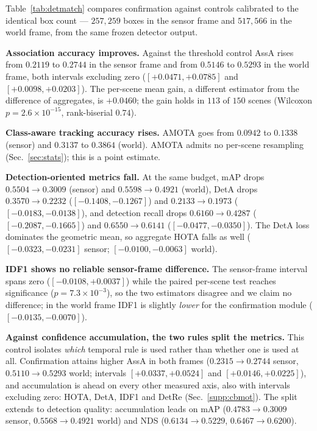 Table~\ref{tab:detmatch} compares confirmation against controls calibrated to
the identical box count --- $257{,}259$ boxes in the sensor frame and
$517{,}566$ in the world frame, from the same frozen detector output.

\noindent\textbf{Association accuracy improves.} Against the threshold control
AssA rises from $0.2119$ to $0.2744$ in the sensor frame and from $0.5146$ to
$0.5293$ in the world frame, both intervals excluding zero
($[{+}0.0471,{+}0.0785]$ and $[{+}0.0098,{+}0.0203]$). The per-scene mean gain, a different estimator
from the difference of aggregates, is $+0.0460$; the gain holds in $113$ of
$150$ scenes
(Wilcoxon $p{=}2.6{\times}10^{-15}$, rank-biserial $0.74$).

\noindent\textbf{Class-aware tracking accuracy rises.} AMOTA goes from
$0.0942$ to $0.1338$ (sensor) and $0.3137$ to $0.3864$ (world). AMOTA admits no per-scene resampling
(Sec.~\ref{sec:stats}); this is a point estimate.

\noindent\textbf{Detection-oriented metrics fall.} At the same budget, mAP
drops $0.5504\!\to\!0.3009$ (sensor) and $0.5598\!\to\!0.4921$ (world), DetA
drops $0.3570\!\to\!0.2232$ ($[{-}0.1408,{-}0.1267]$) and
$0.2133\!\to\!0.1973$ ($[{-}0.0183,{-}0.0138]$), and detection recall drops
$0.6160\!\to\!0.4287$ ($[{-}0.2087,{-}0.1665]$) and $0.6550\!\to\!0.6141$
($[{-}0.0477,{-}0.0350]$). The DetA loss dominates the geometric mean, so
aggregate HOTA falls as well ($[{-}0.0323,{-}0.0231]$ sensor;
$[{-}0.0100,{-}0.0063]$ world).

\noindent\textbf{IDF1 shows no reliable sensor-frame difference.} The
sensor-frame interval spans zero ($[{-}0.0108,{+}0.0037]$) while the paired
per-scene test reaches significance ($p{=}7.3{\times}10^{-3}$), so the two
estimators disagree and we claim no difference; in the world frame IDF1 is
slightly \emph{lower} for the confirmation module
($[{-}0.0135,{-}0.0070]$).

\noindent\textbf{Against confidence accumulation, the two rules split the
metrics.} This control isolates \emph{which} temporal rule is used rather
than whether one is used at all. Confirmation attains higher AssA in both
frames
($0.2315\!\to\!0.2744$ sensor, $0.5110\!\to\!0.5293$ world; intervals
$[{+}0.0337,{+}0.0524]$ and $[{+}0.0146,{+}0.0225]$), and accumulation is ahead
on every other measured axis, also with intervals excluding zero: HOTA, DetA, IDF1 and DetRe
(Sec.~\ref{supp:cbmot}).
The split extends to detection quality: accumulation leads on mAP
($0.4783\!\to\!0.3009$ sensor, $0.5568\!\to\!0.4921$ world) and NDS
($0.6134\!\to\!0.5229$, $0.6467\!\to\!0.6200$).

